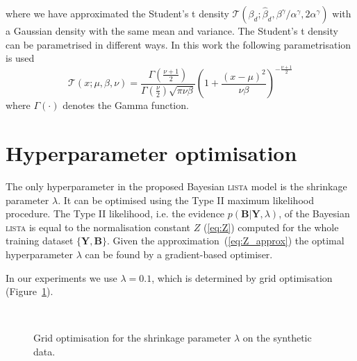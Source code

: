 \documentclass{article}
\begin{document}
where we have approximated the Student's t density $\mathcal{T}\left(\beta_d ; \widehat{\beta}_d, \beta^\gamma / \alpha^\gamma, 2\alpha^\gamma\right)$ with a Gaussian density with the same mean and variance. The Student's t density can be parametrised in different ways. In this work the following parametrisation is used
\begin{equation}
\mathcal{T}(x; \mu, \beta, \nu) = \frac{\Gamma\left(\frac{\nu + 1}{2}\right)}{\Gamma\left(\frac{\nu}{2}\right)\sqrt{\pi \nu \beta}} \left(1 + \frac{(x - \mu)^2}{\nu\beta}\right)^{-\frac{\nu + 1}{2}}
\end{equation}
where $\Gamma(\cdot)$ denotes the Gamma function.

\section{Hyperparameter optimisation}
The only hyperparameter in the proposed Bayesian \textsc{lista} model is the shrinkage parameter $\lambda$. It can be optimised using the Type II maximum likelihood procedure. The Type II likelihood, i.e. the evidence $p(\mathbf{B} | \mathbf{Y}, \lambda)$, of the Bayesian \textsc{lista} is equal to the normalisation constant $Z$ (\ref{eq:Z}) computed for the whole training dataset $\{\mathbf{Y}, \mathbf{B}\}$. Given the approximation~(\ref{eq:Z_approx}) the optimal hyperparameter $\lambda$ can be found by a gradient-based optimiser.

In our experiments we use $\lambda = 0.1$, which is determined by grid optimisation (Figure~\ref{fig:lambda_opt}).

\begin{figure}[h]
\centering
{}~
~
\caption{Grid optimisation for the shrinkage parameter $\lambda$ on the synthetic data.}
\label{fig:lambda_opt}
\end{figure}
\end{document}
